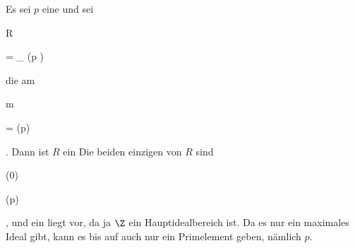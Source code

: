 {


Es sei $p$ eine
und sei


\mavergleichskette

{\vergleichskette

{R
}

{ = }{ \Z_{ (p )}
}

{  }{
}

{    }{
}

{   }{
}

}
{}{}{}
die
am


\mavergleichskette

{\vergleichskette

{ {\mathfrak m}
}

{ = }{ (p)
}

{  }{
}

{    }{
}

{   }{
}

}
{}{}{.}
Dann ist $R$ ein
Die beiden einzigen
von $R$ sind


\mavergleichskette

{\vergleichskette

{(0)
}

{ \subset }{ (p)
}

{  }{
}

{    }{
}

{   }{
}

}
{}{}{,}
und ein
liegt vor, da ja $\Z$ ein Hauptidealbereich ist. Da es nur ein maximales Ideal gibt, kann es bis auf
auch nur ein Primelement geben, nämlich $p$.


}



{}

